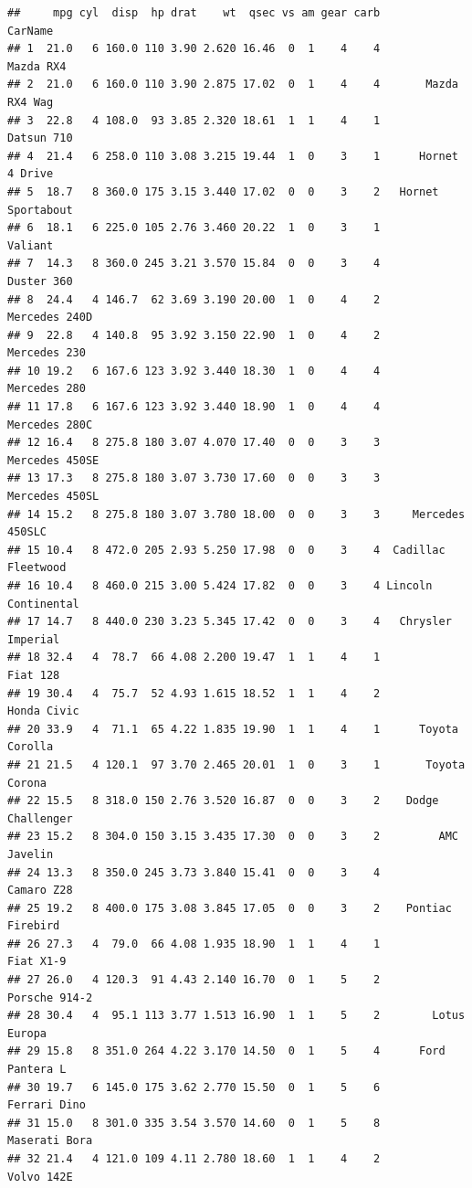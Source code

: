 \documentclass[
]{book}
\begin{document}
\begin{verbatim}
##     mpg cyl  disp  hp drat    wt  qsec vs am gear carb             CarName
## 1  21.0   6 160.0 110 3.90 2.620 16.46  0  1    4    4           Mazda RX4
## 2  21.0   6 160.0 110 3.90 2.875 17.02  0  1    4    4       Mazda RX4 Wag
## 3  22.8   4 108.0  93 3.85 2.320 18.61  1  1    4    1          Datsun 710
## 4  21.4   6 258.0 110 3.08 3.215 19.44  1  0    3    1      Hornet 4 Drive
## 5  18.7   8 360.0 175 3.15 3.440 17.02  0  0    3    2   Hornet Sportabout
## 6  18.1   6 225.0 105 2.76 3.460 20.22  1  0    3    1             Valiant
## 7  14.3   8 360.0 245 3.21 3.570 15.84  0  0    3    4          Duster 360
## 8  24.4   4 146.7  62 3.69 3.190 20.00  1  0    4    2       Mercedes 240D
## 9  22.8   4 140.8  95 3.92 3.150 22.90  1  0    4    2        Mercedes 230
## 10 19.2   6 167.6 123 3.92 3.440 18.30  1  0    4    4        Mercedes 280
## 11 17.8   6 167.6 123 3.92 3.440 18.90  1  0    4    4       Mercedes 280C
## 12 16.4   8 275.8 180 3.07 4.070 17.40  0  0    3    3      Mercedes 450SE
## 13 17.3   8 275.8 180 3.07 3.730 17.60  0  0    3    3      Mercedes 450SL
## 14 15.2   8 275.8 180 3.07 3.780 18.00  0  0    3    3     Mercedes 450SLC
## 15 10.4   8 472.0 205 2.93 5.250 17.98  0  0    3    4  Cadillac Fleetwood
## 16 10.4   8 460.0 215 3.00 5.424 17.82  0  0    3    4 Lincoln Continental
## 17 14.7   8 440.0 230 3.23 5.345 17.42  0  0    3    4   Chrysler Imperial
## 18 32.4   4  78.7  66 4.08 2.200 19.47  1  1    4    1            Fiat 128
## 19 30.4   4  75.7  52 4.93 1.615 18.52  1  1    4    2         Honda Civic
## 20 33.9   4  71.1  65 4.22 1.835 19.90  1  1    4    1      Toyota Corolla
## 21 21.5   4 120.1  97 3.70 2.465 20.01  1  0    3    1       Toyota Corona
## 22 15.5   8 318.0 150 2.76 3.520 16.87  0  0    3    2    Dodge Challenger
## 23 15.2   8 304.0 150 3.15 3.435 17.30  0  0    3    2         AMC Javelin
## 24 13.3   8 350.0 245 3.73 3.840 15.41  0  0    3    4          Camaro Z28
## 25 19.2   8 400.0 175 3.08 3.845 17.05  0  0    3    2    Pontiac Firebird
## 26 27.3   4  79.0  66 4.08 1.935 18.90  1  1    4    1           Fiat X1-9
## 27 26.0   4 120.3  91 4.43 2.140 16.70  0  1    5    2       Porsche 914-2
## 28 30.4   4  95.1 113 3.77 1.513 16.90  1  1    5    2        Lotus Europa
## 29 15.8   8 351.0 264 4.22 3.170 14.50  0  1    5    4      Ford Pantera L
## 30 19.7   6 145.0 175 3.62 2.770 15.50  0  1    5    6        Ferrari Dino
## 31 15.0   8 301.0 335 3.54 3.570 14.60  0  1    5    8       Maserati Bora
## 32 21.4   4 121.0 109 4.11 2.780 18.60  1  1    4    2          Volvo 142E
\end{verbatim}
\end{document}
